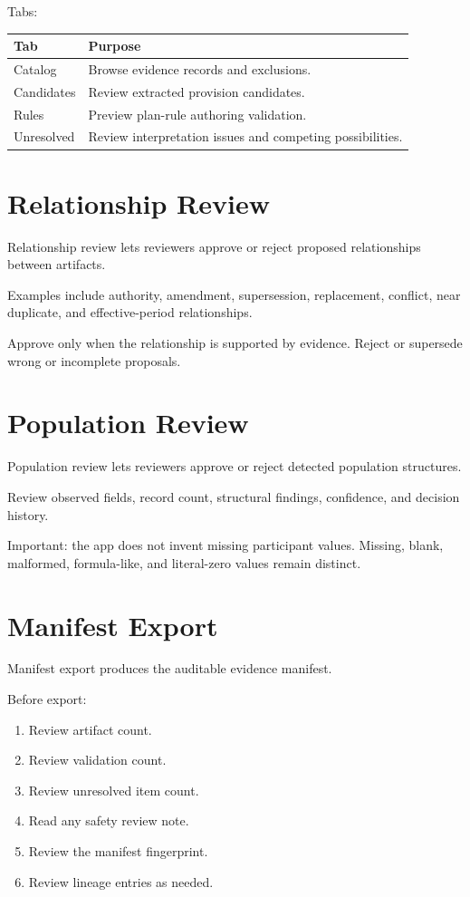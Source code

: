 Tabs:

\begin{longtable}{L{0.25\textwidth}L{0.65\textwidth}}
\toprule
\textbf{Tab} & \textbf{Purpose} \\
\midrule
Catalog & Browse evidence records and exclusions. \\
Candidates & Review extracted provision candidates. \\
Rules & Preview plan-rule authoring validation. \\
Unresolved & Review interpretation issues and competing possibilities. \\
\bottomrule
\end{longtable}

\section{Relationship Review}

Relationship review lets reviewers approve or reject proposed relationships between artifacts.

Examples include authority, amendment, supersession, replacement, conflict, near duplicate, and effective-period relationships.

Approve only when the relationship is supported by evidence. Reject or supersede wrong or incomplete proposals.

\section{Population Review}

Population review lets reviewers approve or reject detected population structures.

Review observed fields, record count, structural findings, confidence, and decision history.

Important: the app does not invent missing participant values. Missing, blank, malformed, formula-like, and literal-zero values remain distinct.

\section{Manifest Export}

Manifest export produces the auditable evidence manifest.

Before export:

\begin{enumerate}
  \item Review artifact count.
  \item Review validation count.
  \item Review unresolved item count.
  \item Read any safety review note.
  \item Review the manifest fingerprint.
  \item Review lineage entries as needed.
\end{enumerate}

